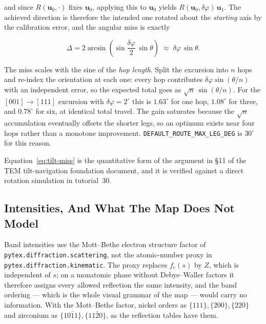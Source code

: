 and since $R(\mathbf{u}_0, \cdot)$ fixes $\mathbf{u}_0$, applying this to
$\mathbf{u}_0$ yields $R(\mathbf{u}_0, \delta\varphi)\,\mathbf{u}_1$. The achieved
direction is therefore the intended one rotated about the \emph{starting} axis by
the calibration error, and the angular miss is exactly

\begin{equation}
  \Delta = 2\arcsin\!\left(\sin\frac{\delta\varphi}{2}\,\sin\theta\right)
         \;\approx\; \delta\varphi\,\sin\theta .
  \label{eq:tilt-miss}
\end{equation}

The miss scales with the sine of the \emph{hop length}. Split the excursion into
$n$ hops and re-index the orientation at each one: every hop contributes
$\delta\varphi\sin(\theta/n)$ with an independent error, so the expected total
goes as $\sqrt{n}\,\sin(\theta/n)$. For the $[001] \to [111]$ excursion with
$\delta\varphi = 2^\circ$ this is $1.63^\circ$ for one hop, $1.08^\circ$ for
three, and $0.78^\circ$ for six, at identical total travel. The gain saturates
because the $\sqrt{n}$ accumulation eventually offsets the shorter legs, so an
optimum exists near four hops rather than a monotone improvement.
\texttt{DEFAULT\_ROUTE\_MAX\_LEG\_DEG} is $30^\circ$ for this reason.

Equation~\eqref{eq:tilt-miss} is the quantitative form of the argument in
\S11 of the TEM tilt-navigation foundation document, and it is verified against a
direct rotation simulation in tutorial~30.

\subsection{Intensities, And What The Map Does Not Model}

Band intensities use the Mott--Bethe electron structure factor of
\texttt{pytex.diffraction.scattering}, not the atomic-number proxy in
\texttt{pytex.diffraction.kinematic}. The proxy replaces $f_e(s)$ by $Z$, which is
independent of $s$; on a monatomic phase without Debye--Waller factors it
therefore assigns every allowed reflection the same intensity, and the band
ordering --- which is the whole visual grammar of the map --- would carry no
information. With the Mott--Bethe factor, nickel orders as $\{111\}, \{200\},
\{220\}$ and zirconium as $\{10\bar{1}1\}, \{11\bar{2}0\}$, as the reflection
tables have them.

